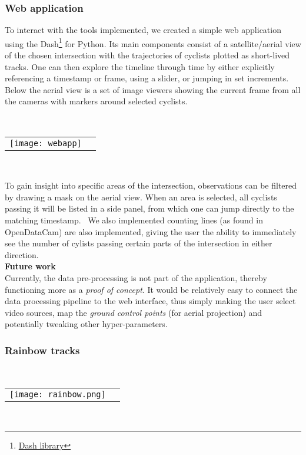 \subsubsection{Web application}
To interact with the tools implemented, we created a simple web application using the Dash\footnote{\href{https://plotly.com/dash/}{Dash library}} for Python. 
Its main components consist of a satellite/aerial view of the chosen intersection with the trajectories of cyclists plotted as short-lived tracks. 
One can then explore the timeline through time by either explicitly referencing a timestamp or frame, using a slider, or jumping in set increments.
Below the aerial view is a set of image viewers showing the current frame from all the cameras with markers around selected cyclists.

\ \\ 
\raggedbottom
\begin{tabular}{@{}cc}
\texttt{[image: webapp]} 
\end{tabular}
\label{webapp}
\

To gain insight into specific areas of the intersection, observations can be filtered by drawing a mask on the aerial view. 
When an area is selected, all cyclists passing it will be listed in a side panel, from which one can jump directly to the matching timestamp.
\
We also implemented counting lines (as found in OpenDataCam) are also implemented, giving the user the ability to immediately see the number of 
cylists passing certain parts of the intersection in either direction.
\ \\

\textbf{Future work} \\
Currently, the data pre-processing is not part of the application, thereby functioning more as a \textit{proof of concept}.
It would be relatively easy to connect the data processing pipeline to the web interface, thus simply making the user 
select video sources, map the \textit{ground control points} (for aerial projection) and potentially tweaking other hyper-parameters. 

\subsubsection{Rainbow tracks}

\ \\ 
\noindent
\begin{tabular}{@{}cc}
\texttt{[image: rainbow.png]} 
\end{tabular}
\label{Rainbow}
\

